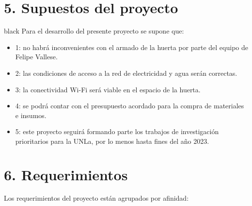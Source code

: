 \documentclass[
11pt, %
codirector, %
]{charter}
\begin{document}
\section{5. Supuestos del proyecto}
\label{sec:supuestos}

\begin{consigna}{black}
Para el desarrollo del presente proyecto se supone que:

\begin{itemize}
	\item 1: no habrá inconvenientes con el armado de la huerta por parte del equipo de Felipe Vallese.
	\item 2: las condiciones de acceso a la red de electricidad y agua serán correctas.
	\item 3: la conectividad Wi-Fi será viable en el espacio de la huerta.
	\item 4: se podrá contar con el presupuesto acordado para la compra de materiales e insumos.
	\item 5: este proyecto seguirá formando parte los trabajos de investigación prioritarios para la UNLa, por lo menos hasta fines del año 2023.
\end{itemize}
\end{consigna}

\section{6. Requerimientos}
\label{sec:requerimientos}

Los requerimientos del proyecto están agrupados por afinidad:
\end{document}

